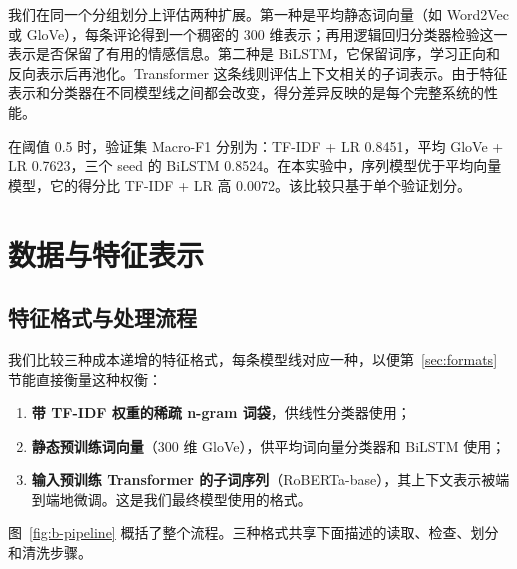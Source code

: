 \documentclass[11pt,a4paper]{article}
\begin{document}
我们在同一个分组划分上评估两种扩展。第一种是平均静态词向量（如 Word2Vec 或 GloVe）\cite{mikolov2013efficient,pennington2014glove}，每条评论得到一个稠密的 300 维表示；再用逻辑回归分类器检验这一表示是否保留了有用的情感信息。第二种是 BiLSTM，它保留词序，学习正向和反向表示后再池化。Transformer 这条线则评估上下文相关的子词表示。由于特征表示和分类器在不同模型线之间都会改变，得分差异反映的是每个完整系统的性能。

在阈值 0.5 时，验证集 Macro-F1 分别为：TF-IDF + LR 0.8451，平均 GloVe + LR 0.7623，三个 seed 的 BiLSTM 0.8524。在本实验中，序列模型优于平均向量模型，它的得分比 TF-IDF + LR 高 0.0072。该比较只基于单个验证划分。

\section{数据与特征表示}\label{sec:data}

\subsection{特征格式与处理流程}
我们比较三种成本递增的特征格式，每条模型线对应一种，以便第~\ref{sec:formats} 节能直接衡量这种权衡：
\begin{enumerate}
  \item \textbf{带 TF-IDF 权重的稀疏 n-gram 词袋}，供线性分类器使用；
  \item \textbf{静态预训练词向量}（300 维 GloVe\cite{pennington2014glove}），供平均词向量分类器和 BiLSTM 使用；
  \item \textbf{输入预训练 Transformer 的子词序列}（RoBERTa-base），其上下文表示被端到端地微调。这是我们最终模型使用的格式。
\end{enumerate}
图~\ref{fig:b-pipeline} 概括了整个流程。三种格式共享下面描述的读取、检查、划分和清洗步骤。
\end{document}
